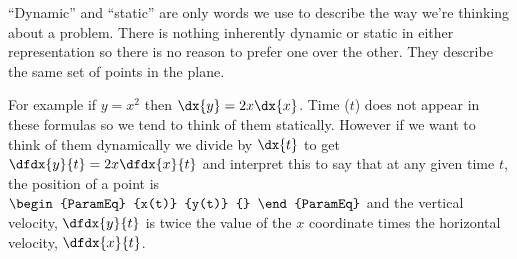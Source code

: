 
``Dynamic'' and
``static'' are only words we use to describe the way we're thinking
about a problem. There is nothing inherently dynamic or static in either representation
so there is no  reason to prefer one over the
other. They describe the same set of points in the plane. 

For example if $y=x^2$ then $\dx{y}=2x\dx{x}$. Time ($t$) does not
appear in these formulas so we tend to think of them
statically. However if we want to think of them dynamically we divide
by $\dx{t}$ to get $\dfdx{y}{t}=2x\dfdx{x}{t}$ and interpret this to
say that at any given time $t$, the position of a point is
$
\begin{ParamEq}
  {x(t)}
{y(t)}
{}
\end{ParamEq}
$ and the vertical velocity, $\dfdx{y}{t}$ is twice the
value of the $x$ coordinate times the horizontal velocity,
$\dfdx{x}{t}$.


